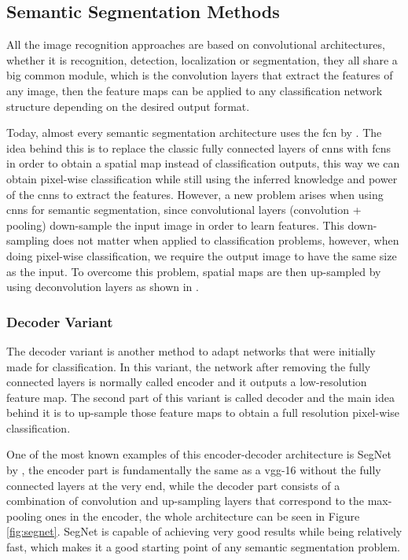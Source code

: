 \subsection{Semantic Segmentation Methods}
\label{sec:segmentation_variants}
All the image recognition approaches are based on convolutional architectures, whether it is recognition, detection, localization or segmentation, they all share a big common module, which is the convolution layers that extract the features of any image, then the feature maps can be applied to any classification network structure depending on the desired output format.

Today, almost every semantic segmentation architecture uses the \gls{fcn} by \cite{DBLP:journals/corr/LongSD14}. The idea behind this is to replace the classic fully connected layers of \gls{cnn}s with \gls{fcn}s in order to obtain a spatial map instead of classification outputs, this way we can obtain pixel-wise classification while still using the inferred knowledge and power of the \gls{cnn}s to extract the features. However, a new problem arises when using \gls{cnn}s for semantic segmentation, since convolutional layers (convolution + pooling) down-sample the input image in order to learn features. This down-sampling does not matter when applied to classification problems, however, when doing pixel-wise classification, we require the output image to have the same size as the input. To overcome this problem, spatial maps are then up-sampled by using deconvolution layers as shown in \cite{deconvolution}.

\subsubsection{Decoder Variant}
The decoder variant is another method to adapt networks that were initially made for classification. In this variant, the network after removing the fully connected layers is normally called encoder and it outputs a low-resolution feature map. The second part of this variant is called decoder and the main idea behind it is to up-sample those feature maps to obtain a full resolution pixel-wise classification.

One of the most known examples of this encoder-decoder architecture is SegNet by \cite{DBLP:journals/corr/BadrinarayananK15}, the encoder part is fundamentally the same as a \gls{vgg}-16 without the fully connected layers at the very end, while the decoder part consists of a combination of convolution and up-sampling layers that correspond to the max-pooling ones in the encoder, the whole architecture can be seen in Figure \ref{fig:segnet}. SegNet is capable of achieving very good results while being relatively fast, which makes it a good starting point of any semantic segmentation problem.


